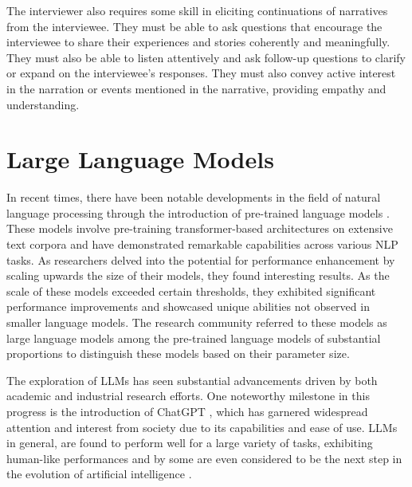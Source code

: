 The interviewer also requires some skill in eliciting continuations of narratives from the interviewee. They must be able to ask questions that encourage the interviewee to share their experiences and stories coherently and meaningfully. They must also be able to listen attentively and ask follow-up questions to clarify or expand on the interviewee's responses. They must also convey active interest in the narration or events mentioned in the narrative, providing empathy and understanding. \cite{Fairbairn2002-xd}
\section{Large Language Models}
In recent times, there have been notable developments in the field of natural language processing through the introduction of pre-trained language models \cite{radford2018improving}. These models involve pre-training transformer-based architectures \cite{vaswani2017attention} on extensive text corpora and have demonstrated remarkable capabilities across various NLP tasks. As researchers delved into the potential for performance enhancement by scaling upwards the size of their models, they found interesting results. As the scale of these models exceeded certain thresholds, they exhibited significant performance improvements and showcased unique abilities not observed in smaller language models. The research community referred to these models as large language models among the pre-trained language models of substantial proportions to distinguish these models based on their parameter size. \cite{zhao2023survey,wei2022emergent}

The exploration of LLMs has seen substantial advancements driven by both academic and industrial research efforts. One noteworthy milestone in this progress is the introduction of ChatGPT \cite{chatgpt}, which has garnered widespread attention and interest from society due to its capabilities and ease of use. LLMs in general, are found to perform well for a large variety of tasks, exhibiting human-like performances and by some are even considered to be the next step in the evolution of artificial intelligence \cite{bubeck2023sparks}.  

